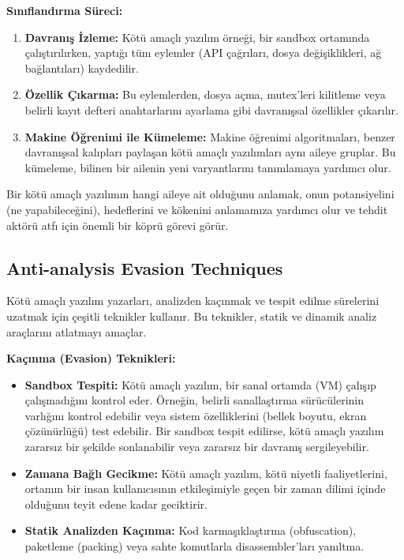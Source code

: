 \textbf{Sınıflandırma Süreci:}
\begin{enumerate}
    \item \textbf{Davranış İzleme:} Kötü amaçlı yazılım örneği, bir sandbox ortamında çalıştırılırken, yaptığı tüm eylemler (API çağrıları, dosya değişiklikleri, ağ bağlantıları) kaydedilir.
    \item \textbf{Özellik Çıkarma:} Bu eylemlerden, dosya açma, mutex'leri kilitleme veya belirli kayıt defteri anahtarlarını ayarlama gibi davranışsal özellikler çıkarılır.
    \item \textbf{Makine Öğrenimi ile Kümeleme:} Makine öğrenimi algoritmaları, benzer davranışsal kalıpları paylaşan kötü amaçlı yazılımları aynı aileye gruplar. Bu kümeleme, bilinen bir ailenin yeni varyantlarını tanımlamaya yardımcı olur.
\end{enumerate}

Bir kötü amaçlı yazılımın hangi aileye ait olduğunu anlamak, onun potansiyelini (ne yapabileceğini), hedeflerini ve kökenini anlamamıza yardımcı olur ve tehdit aktörü atfı için önemli bir köprü görevi görür.

\subsection{Anti-analysis Evasion Techniques}

Kötü amaçlı yazılım yazarları, analizden kaçınmak ve tespit edilme sürelerini uzatmak için çeşitli teknikler kullanır. Bu teknikler, statik ve dinamik analiz araçlarını atlatmayı amaçlar.

\textbf{Kaçınma (Evasion) Teknikleri:}
\begin{itemize}
    \item \textbf{Sandbox Tespiti:} Kötü amaçlı yazılım, bir sanal ortamda (VM) çalışıp çalışmadığını kontrol eder. Örneğin, belirli sanallaştırma sürücülerinin varlığını kontrol edebilir veya sistem özelliklerini (bellek boyutu, ekran çözünürlüğü) test edebilir. Bir sandbox tespit edilirse, kötü amaçlı yazılım zararsız bir şekilde sonlanabilir veya zararsız bir davranış sergileyebilir.
    \item \textbf{Zamana Bağlı Gecikme:} Kötü amaçlı yazılım, kötü niyetli faaliyetlerini, ortamın bir insan kullanıcısının etkileşimiyle geçen bir zaman dilimi içinde olduğunu teyit edene kadar geciktirir.
    \item \textbf{Statik Analizden Kaçınma:} Kod karmaşıklaştırma (obfuscation), paketleme (packing) veya sahte komutlarla disassembler'ları yanıltma.
\end{itemize}

